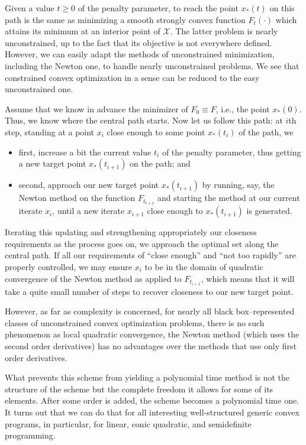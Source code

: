 \documentclass[11pt,a4paper]{article}
\begin{document}
Given a value $t \geq 0$ of the penalty parameter, to reach the point $x_*(t)$ on this path is the same as minimizing a smooth strongly convex function $F_t(\cdot)$ which attains its minimum at an interior point of $\mathcal{X}$. The latter problem is nearly unconstrained, up to the fact that its objective is not everywhere defined. However, we can easily adapt the methods of unconstrained minimization, including the Newton one, to handle nearly unconstrained problems. We see that constrained convex optimization in a sense can be
reduced to the easy unconstrained one.

Assume that we know in advance the minimizer of $F_0 \equiv F$, i.e., the point $x_*(0)$. Thus, we know where the central path starts. Now let us follow this path: at $i$th step, standing at a point $x_i$ close enough to some point $x_*(t_i)$ of the path, we
\begin{itemize}
\item first, increase a bit the current value $t_i$ of the penalty parameter, thus getting a new target point $x_*(t_{i+1})$ on the path; and
\item second, approach our new target point $x_*(t_{i+1})$ by running, say, the Newton method on the function $F_{t_{t+1}}$ and starting the method at our current iterate $x_i$, until a new iterate $x_{i+1}$ close enough to $x_*(t_{i+1})$ is generated.
\end{itemize}

Iterating this updating and strengthening appropriately our closeness requirements as the process goes on, we approach the optimal set along the central path. If all our requirements of “close enough” and “not too rapidly” are properly controlled, we may ensure $x_i$ to be in the domain of quadratic convergence of the Newton method as applied to $F_{t_{i+1}}$, which means that it will take a quite small number of steps to recover closeness to our new target point.

However, as far as complexity is concerned, for nearly all black box–represented classes of unconstrained convex optimization problems, there is no such phenomenon as local quadratic convergence, the Newton method (which uses the second order derivatives) has no advantages over the methods that use only first order derivatives.

What prevents this scheme from yielding a polynomial time method is not the structure of the scheme but the complete freedom it allows for some of its elements. After some order is added, the scheme becomes a polynomial
time one. It turns out that we can do that for all interesting well-structured generic convex programs, in particular, for linear, conic quadratic, and semidefinite programming.
\end{document}
